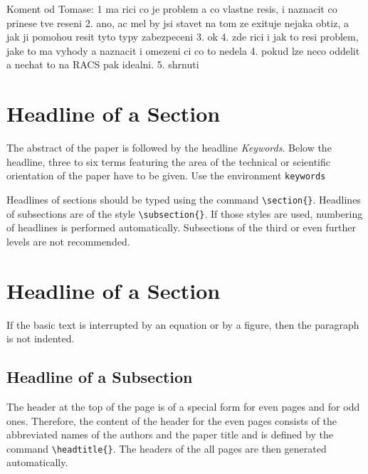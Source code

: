 \documentclass{poster15}
\begin{document}
Koment od Tomase:
1 ma rici co je problem a co vlastne resis, i naznacit co prinese tve reseni
2. ano, ac mel by jsi stavet na tom ze exituje nejaka obtiz, a jak ji pomohou resit tyto typy zabezpeceni
3. ok
4. zde rici i jak to resi problem, jake to ma vyhody a naznacit i omezeni ci co to nedela
4. pokud lze neco oddelit a nechat to na RACS pak idealni.
5. shrnuti

\section{Headline of a Section}
The abstract of the paper is followed by the headline \emph{Keywords}. Below the headline, three to six terms featuring the area of the technical or scientific orientation of the paper have to be given. Use the environment \verb+keywords+
 
Headlines of sections should be typed using the command \verb+\section{}+. Headlines of subsections are of the style \verb+\subsection{}+. If those styles are used, numbering of headlines is performed automatically. Subsections of the third or even further levels are not recommended.

\section{Headline of a Section}
If the basic text is interrupted by an equation or by a figure, then the paragraph is not indented.

\subsection{Headline of a Subsection}
The header at the top of the page is of a special form for even pages and for odd ones. Therefore, the content of the header for the even pages consists of the abbreviated names of the authors and the paper title and is defined by the command \verb+\headtitle{}+. The headers of the all pages are then generated automatically.
\end{document}
